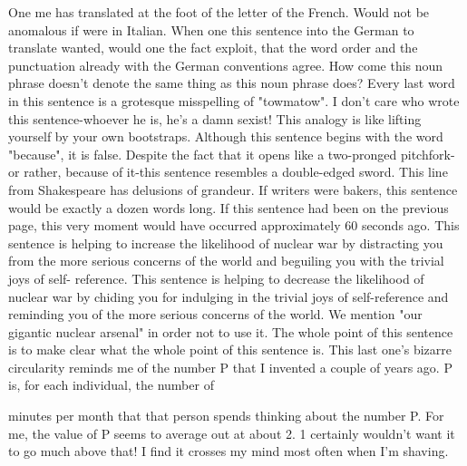 One me has translated at the foot of the letter of the French. 
Would not be anomalous if were in Italian. 
When one this sentence into the German to translate wanted, would one the fact exploit, that the word order and the punctuation already with the German conventions agree. 
How come this noun phrase doesn't denote the same thing as this noun phrase does? 
Every last word in this sentence is a grotesque misspelling of "towmatow". 
I don't care who wrote this sentence-whoever he is, he's a damn sexist! 
This analogy is like lifting yourself by your own bootstraps. 
Although this sentence begins with the word "because", it is false. 
Despite the fact that it opens like a two-pronged pitchfork-or rather, because of it-this sentence resembles a double-edged sword. 
This line from Shakespeare has delusions of grandeur. 
If writers were bakers, this sentence would be exactly a dozen words long. 
If this sentence had been on the previous page, this very moment would have occurred approximately 60 seconds ago. 
This sentence is helping to increase the likelihood of nuclear war by distracting you from the more serious concerns of the world and beguiling you with the trivial joys of self- reference. 
This sentence is helping to decrease the likelihood of nuclear war by chiding you for indulging in the trivial joys of self-reference and reminding you of the more serious concerns of the world. 
We mention "our gigantic nuclear arsenal" in order not to use it. 
The whole point of this sentence is to make clear what the whole point of this sentence is. 
This last one's bizarre circularity reminds me of the number P that I invented a couple of years ago. P is, for each individual, the number of 



minutes per month that that person spends thinking about the number P. For me, the value of P seems to average out at about 2. 1 certainly wouldn't want it to go much above that! I find it crosses my mind most often when I'm shaving. 
\separator

